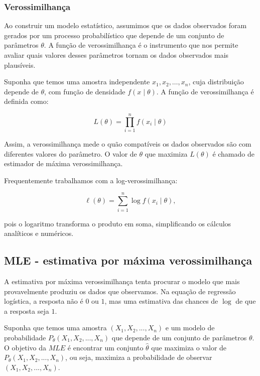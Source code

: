 \documentclass{article}
\begin{document}
\subsubsection{Verossimilhança}

Ao construir um modelo estatístico, assumimos que os dados observados foram
gerados por um processo probabilístico que depende de um conjunto de parâmetros
$\theta$. A função de verossimilhança é o instrumento que nos permite avaliar
quais valores desses parâmetros tornam os dados observados mais plausíveis.

Suponha que temos uma amostra independente
$x_1, x_2, \dots, x_n$, cuja distribuição depende de $\theta$,
com função de densidade $f(x \mid \theta)$.
A função de verossimilhança é definida como:

\begin{equation}
    L(\theta) = \prod_{i=1}^{n} f(x_i \mid \theta)
\end{equation}

Assim, a verossimilhança mede o quão compatíveis os dados observados são
com diferentes valores do parâmetro. O valor de $\theta$ que maximiza
$L(\theta)$ é chamado de estimador de máxima verossimilhança.

Frequentemente trabalhamos com a log-verossimilhança:

\begin{equation}
    \ell(\theta) = \sum_{i=1}^{n} \log f(x_i \mid \theta),
\end{equation}

pois o logaritmo transforma o produto em soma, simplificando os cálculos
analíticos e numéricos.

\subsection{MLE - estimativa por máxima verossimilhança}

 A estimativa por máxima verossimilhança tenta procurar o modelo 
 que mais provavelmente produziu os dados que observamos. Na equação
 de regressão logística, a resposta não é $0$ ou $1$, mas uma estimativa
 das chances de $\log$ de que a resposta seja $1$.

 Suponha que temos uma amostra $(X_1, X_2, ..., X_n)$ e um modelo de probabilidade 
$P_{\theta}(X_1, X_2, ..., X_n)$ que depende de um conjunto de parâmetros $\theta$.
O objetivo da $MLE$ é encontrar um conjunto $\hat{\theta}$ que maximiza 
o valor de $P_{\theta}(X_1, X_2, ..., X_n)$, ou seja, maximiza a probabilidade de 
observar $(X_1, X_2, ..., X_n)$.
\end{document}
